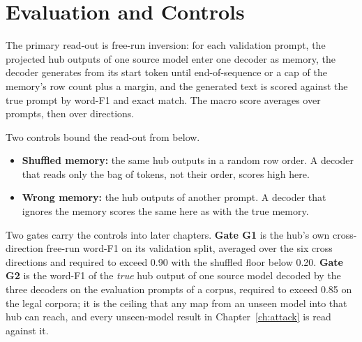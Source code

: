 \section{Evaluation and Controls}\label{sec:hub:readout}

The primary read-out is free-run inversion: for each validation prompt, the projected hub outputs of one source model enter one decoder as memory, the decoder generates from its start token until end-of-sequence or a cap of the memory's row count plus a margin, and the generated text is scored against the true prompt by word-F1 and exact match. The macro score averages over prompts, then over directions.

Two controls bound the read-out from below.
\begin{itemize}
\item \textbf{Shuffled memory:} the same hub outputs in a random row order. A decoder that reads only the bag of tokens, not their order, scores high here.
\item \textbf{Wrong memory:} the hub outputs of another prompt. A decoder that ignores the memory scores the same here as with the true memory.
\end{itemize}

Two gates carry the controls into later chapters. \textbf{Gate G1} is the hub's own cross-direction free-run word-F1 on its validation split, averaged over the six cross directions and required to exceed 0.90 with the shuffled floor below 0.20. \textbf{Gate G2} is the word-F1 of the \emph{true} hub output of one source model decoded by the three decoders on the evaluation prompts of a corpus, required to exceed 0.85 on the legal corpora; it is the ceiling that any map from an unseen model into that hub can reach, and every unseen-model result in Chapter~\ref{ch:attack} is read against it.
